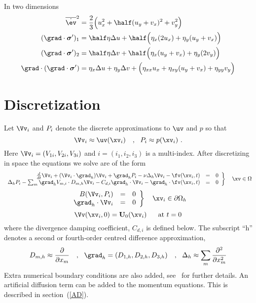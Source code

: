 \documentclass[12pt]{article}
\begin{document}
In two dimensions
\begin{align*}
 \esr^2 &=  {2\over 3} \Big( u_x^2 + \half ( u_y + v_x )^2 + v_y^2 \Big)  \\
 (\grad\cdot \sigmav')_1 &= \half\eta\Delta u 
         +\half\Big( \eta_x(2u_x) + \eta_y(u_y+v_x)\Big) \\
 (\grad\cdot \sigmav')_2 &= \half\eta\Delta v 
         +\half\Big( \eta_x(u_y+v_x) + \eta_y(2v_y)\Big) \\
 \grad\cdot(\grad\cdot \sigmav') &= \eta_x\Delta u + \eta_y\Delta v +
    \Big( \eta_{xx}u_x+ \eta_{xy}(u_y+v_x) + \eta_{yy}v_y \Big)
\end{align*}


\section{ Discretization}

\newcommand{\id}{i}
\def\Fs {{\cal F}}
Let $\Vv_i$ and $\pd_\id$ denote the discrete approximations to
$\uv$ and $p$ so that
\[
      \Vv_i \approx \uv(\xv_{\id})  \comma
      \pd_{\id} \approx p(\xv_{\id})  ~.
\]
Here $\Vv_i=(V_{1\id},V_{2\id},V_{3\id})$ and
$\id=(i_1,i_2,i_3)$ is a multi-index.
After discretizing in space the equations we solve are of the form
$$
 \left. \begin{array}{rcl}
  {d\over dt} \Vv_i + (\Vv_i\cdot\grad_h)\Vv_i + \grad_h \pd_i
       - \nu \Delta_h \Vv_i -\fv(\xv_i,t) &=&0
                                                \\
  \Delta_h \pd_i - \sum_m \grad_h V_{m,i} \cdot D_{m,h} \Vv_i
   - C_{d,i} \grad_h\cdot\Vv_i
   - \grad_h\cdot\fv(\xv_i,t)  &=&0
        \end{array}\right\} ~~~ \xv\in\Omega
$$
$$
 \left. \begin{array}{rcl}
        B(\Vv_i,\pd_i) &=& 0   \\
   \grad_h\cdot\Vv_i &=& 0
        \end{array}\right\} ~~~ \xv_i\in\partial\Omega_h
$$
$$
   \Vv(\xv_i,0) = \uvd_0(\xv_i)   ~~~~\mbox{ at } t=0
$$
where the divergence damping coefficient, $C_{d,i}$ is defined below.
The subscript ``h'' denotes a second or fourth-order centred difference
approximation,
$$
  D_{m,h} \approx {\partial \over \partial x_m} ~~~,~~
  \grad_h = (D_{1,h}, D_{2,h}, D_{3,h} ) ~~~,~~
  \Delta_h \approx \sum_m {\partial^2 \over \partial x_m^2}
$$
Extra numerical boundary conditions are also added, see~\cite{ICSSI}
\cite{BCSSI} for further details. An artificial diffusion term can be
added to the momentum equations. This is described in section~(\ref{AD}).
\end{document}
